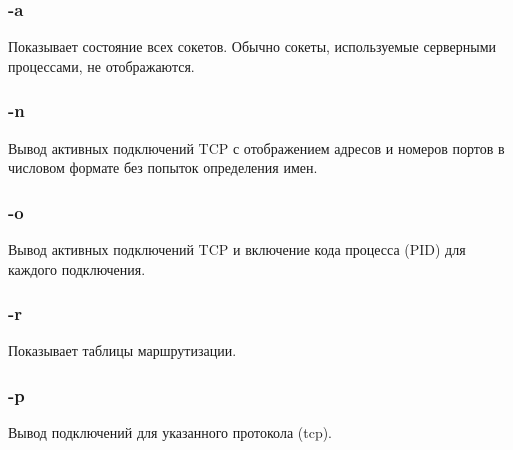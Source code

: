 \subsubsection{-a}

Показывает состояние всех сокетов. Обычно сокеты, используемые серверными
процессами, не отображаются.

\subsubsection{-n}
Вывод активных подключений TCP с отображением адресов и номеров портов в
числовом формате без попыток определения имен.

\subsubsection{-o}
Вывод активных подключений TCP и включение кода процесса (PID) для каждого
подключения.

\subsubsection{-r}
Показывает таблицы маршрутизации.

\subsubsection{-p}
Вывод подключений для указанного протокола (tcp).



\endinput